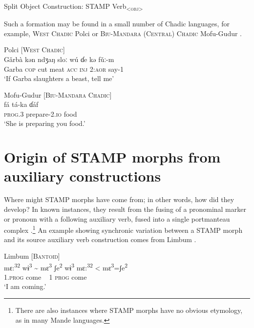 \documentclass[output=paper]{langsci/langscibook}
\begin{document}
\ea\label{ex:anderson:30}
Split Object Construction:   STAMP  Verb\textsc{\textsubscript{<obj>}}
\z

Such a formation may be found in a small number of Chadic languages, for example, \textsc{West Chadic} Polci  or \textsc{Biu-Mandara (Central) Chadic} Mofu-Gudur . 

\ea\label{ex:anderson:31}
Polci \citep[153]{Caron2008}          \textsc{[West Chadic]}\\
\gll Gǎrbà   kən  ndʒaŋ  sloː  wú  ɗe  kə   fǔː-m \\
Garba  \textsc{cop}  cut  meat  \textsc{acc}  \textsc{inj}  \textsc{2:aor}  say-1  \\
\glt `If Garba slaughters a beast, tell me'
\z

\ea\label{ex:anderson:32}
Mofu-Gudur \citep[4]{Pohlig1992}          \textsc{[Biu-Mandara Chadic]}\\
\gll fá    tá-ka    ɗáf      \\
\textsc{prog.3}  prepare-2\textsc{.io}  food    \\
\glt `She is preparing you food.'
\z

\section{Origin of STAMP morphs from auxiliary constructions}\label{sec:Anderson:5}

Where might STAMP morphs have come from; in other words, how did they develop? In known instances, they result from the fusing of a pronominal marker or pronoun with a following auxiliary verb, fused into a single portmanteau complex \citep{Anderson2006, Anderson2011}.\footnote{There are also instances where STAMP morphs have no obvious etymology, as in many Mande languages.} An example showing synchronic variation between a STAMP morph and its source auxiliary verb construction comes from Limbum .

\ea\label{ex:anderson:33}
Limbum \citep[Limbum 3-4]{FiorePeck1973/1980}      \textsc{[Bantoid]}\\
\gll mɛ:\textsuperscript{32}  wɨ\textsuperscript{3}   {\textasciitilde}   mɛ\textsuperscript{3}  ʃe\textsuperscript{2}  wɨ\textsuperscript{3 }   mɛ:\textsuperscript{32} < mɛ\textsuperscript{3}=ʃe\textsuperscript{2}\\
\textsc{1.prog}  come  ~  1  \textsc{prog}  come\\
\glt `I am coming.'
\z
\end{document}
